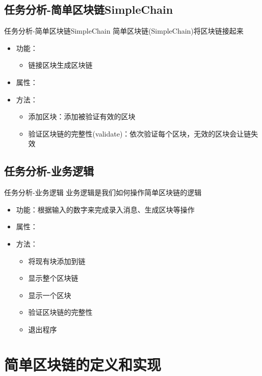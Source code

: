 \documentclass[11pt]{beamer}
\begin{document}
\subsection{任务分析-简单区块链SimpleChain}
\begin{frame}{任务分析-简单区块链SimpleChain}
	简单区块链(SimpleChain)将区块链接起来
	\begin{itemize}
		\item 功能：
		\begin{itemize}
			\item 链接区块生成区块链
		\end{itemize}
		\item 属性：
		\item 方法：
		\begin{itemize}
			\item 添加区块：添加被验证有效的区块

			\item 验证区块链的完整性(validate)：依次验证每个区块，无效的区块会让链失效
		\end{itemize}
	\end{itemize}
\end{frame}

\subsection{任务分析-业务逻辑}
\begin{frame}{任务分析-业务逻辑}
	业务逻辑是我们如何操作简单区块链的逻辑
	\begin{itemize}
		\item 功能：根据输入的数字来完成录入消息、生成区块等操作
		\item 属性：
		\item 方法：
		\begin{itemize}
			\item 将现有块添加到链
			
			\item 显示整个区块链
			
			\item 显示一个区块
			
			\item 验证区块链的完整性
			
			\item 退出程序
		\end{itemize}
	\end{itemize}
\end{frame}

\section{简单区块链的定义和实现}
\end{document}
